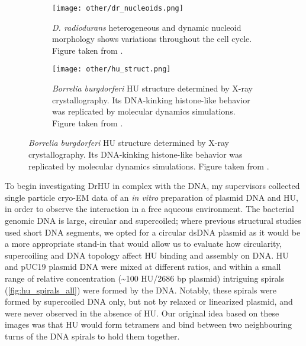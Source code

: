 \begin{figure}
    \centering
    \begin{subfigure}[B]{.48\textwidth}
        \centering
        \texttt{[image: other/dr\_nucleoids.png]}
        \caption{\textit{D. radiodurans} heterogeneous and dynamic nucleoid morphology shows variations throughout the cell cycle. Figure taken from \citet{flochCellMorphologyNucleoid2019}.}
        \label{fig:hu_nucleoids}
    \end{subfigure}%
    \hfill
    \begin{subfigure}[B]{.5\textwidth}
        \centering
        \texttt{[image: other/hu\_struct.png]}
        \caption{\textit{Borrelia burgdorferi} HU structure determined by X-ray crystallography. Its DNA-kinking histone-like behavior was replicated by molecular dynamics simulations. Figure taken from \citet{hognonMolecularBasesDNA2019}.}
        \label{fig:hu_structure}
    \end{subfigure}%
    \label{fig:hu}
\end{figure}

To begin investigating DrHU in complex with the DNA, my supervisors collected single particle cryo-EM data of an \textit{in vitro} preparation of plasmid DNA and HU, in order to observe the interaction in a free aqueous environment.
The bacterial genomic DNA is large, circular and supercoiled; where previous structural studies used short DNA segments, we opted for a circular dsDNA plasmid as it would be a more appropriate stand-in that would allow us to evaluate how circularity, supercoiling and DNA topology affect HU binding and assembly on DNA.
HU and pUC19 plasmid DNA were mixed at different ratios, and within a small range of relative concentration (\sim100 HU/2686 bp plasmid) intriguing spirals (\autoref{fig:hu_spirals_all}) were formed by the DNA.
Notably, these spirals were formed by supercoiled DNA only, but not by relaxed or linearized plasmid, and were never observed in the absence of HU.
Our original idea based on these images was that HU would form tetramers and bind between two neighbouring turns of the DNA spirals to hold them together.

